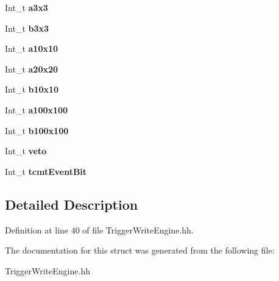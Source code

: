 \begin{DoxyCompactItemize}
\item 
Int\-\_\-t {\bfseries a3x3}\label{structmarlin_1_1TriggerWriteEngine_1_1TrigBits__t_a0f9465a7d5475ec1134cb147789b1365}

\item 
Int\-\_\-t {\bfseries b3x3}\label{structmarlin_1_1TriggerWriteEngine_1_1TrigBits__t_a8a0b9ea0bd5f9934e81dd1d467dd6906}

\item 
Int\-\_\-t {\bfseries a10x10}\label{structmarlin_1_1TriggerWriteEngine_1_1TrigBits__t_a45f03aca2a1e0cc9b0051a248b22822e}

\item 
Int\-\_\-t {\bfseries a20x20}\label{structmarlin_1_1TriggerWriteEngine_1_1TrigBits__t_ad90f74da3bef681a58a9281e2de6f7c6}

\item 
Int\-\_\-t {\bfseries b10x10}\label{structmarlin_1_1TriggerWriteEngine_1_1TrigBits__t_a769d73a2418b9152aed657d4f20aa212}

\item 
Int\-\_\-t {\bfseries a100x100}\label{structmarlin_1_1TriggerWriteEngine_1_1TrigBits__t_ad8b904c8090e72866c6519293342d354}

\item 
Int\-\_\-t {\bfseries b100x100}\label{structmarlin_1_1TriggerWriteEngine_1_1TrigBits__t_a4d9d064d62b762665ef14923b28426ed}

\item 
Int\-\_\-t {\bfseries veto}\label{structmarlin_1_1TriggerWriteEngine_1_1TrigBits__t_ac26914098e75362f8c486f9e98f12d01}

\item 
Int\-\_\-t {\bfseries tcmt\-Event\-Bit}\label{structmarlin_1_1TriggerWriteEngine_1_1TrigBits__t_ad0e09a40117811e97a00221376019fa9}

\end{DoxyCompactItemize}


\subsection{Detailed Description}


Definition at line 40 of file Trigger\-Write\-Engine.\-hh.



The documentation for this struct was generated from the following file\-:\begin{DoxyCompactItemize}
\item 
Trigger\-Write\-Engine.\-hh\end{DoxyCompactItemize}
